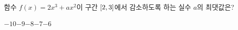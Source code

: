 함수 $f(x)=2x^3+ax^2$이 구간 $[2{,}\mkern3mu\mathopen{}3]$에서 감소하도록 하는 실수 $a$의 최댓값은?
\begin{choices32}{$-10$}{$-9$}{$-8$}{$-7$}{$-6$}\end{choices32}
